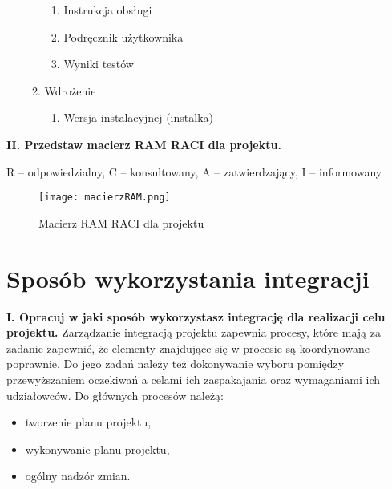 \begin{enumerate}
\begin{enumerate}
\begin{enumerate}

\item Instrukcja obsługi
\item Podręcznik użytkownika
\item Wyniki testów

\end{enumerate}

\item Wdrożenie

\begin{enumerate}

\item Wersja instalacyjnej (instalka)

\end{enumerate}
\end{enumerate}
\end{enumerate}



\textbf{II. Przedstaw macierz RAM RACI dla projektu.}

R – odpowiedzialny, C – konsultowany, A – zatwierdzający, I – informowany

\begin{figure}[!h]
\centering
\texttt{[image: macierzRAM.png]}
\caption{Macierz RAM RACI dla projektu}
\label{fig:macierzRAM}
\end{figure}



\section{Sposób wykorzystania integracji}

\textbf{I. Opracuj w jaki sposób wykorzystasz integrację dla realizacji celu projektu.}
Zarządzanie integracją projektu zapewnia procesy, które mają za zadanie zapewnić, że elementy znajdujące się w procesie są koordynowane poprawnie. Do jego zadań należy też dokonywanie wyboru pomiędzy przewyższaniem oczekiwań a celami ich zaspakajania oraz wymaganiami ich udziałowców.
Do głównych procesów należą:

\begin{itemize}
\item tworzenie planu projektu,
\item wykonywanie planu projektu,
\item ogólny nadzór zmian.
\end{itemize}

